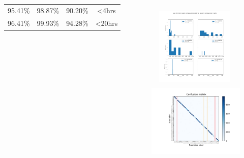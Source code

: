\documentclass[8pt]{beamer}
\begin{document}
\begin{frame}
\begin{columns}
\begin{tabular*}{\textwidth}{|c|c|c|c|}
		\hline\hline
		95.41\% & 98.87\% & 90.20\% & \textless4hrs \\
		96.41\% & 99.93\% & 94.28\% & \textless20hrs \\
		\hline
	\end{tabular*}
	\begin{figure}
		\includegraphics[height=3.7cm,width=4.5cm]{../plots/plot_performance_histogram.png}
		\onslide<3->\includegraphics[height=3.8cm, width=5.5cm]{../plots/confusion_matrix_20.png}
	\end{figure}

\end{columns}
\pause
\end{frame}
\end{document}
